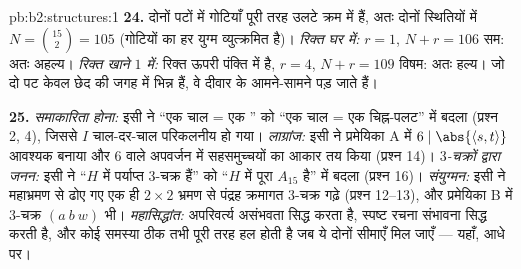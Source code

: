 \begin{solution}{pb:b2:structures:1}
\textbf{24.} दोनों पटों में गोटियाँ पूरी तरह उलटे क्रम में हैं, अतः
दोनों स्थितियों में $N = \binom{15}{2} = 105$ (गोटियों का हर युग्म व्युत्क्रमित है)।
\emph{रिक्त घर में:} $r = 1$, $N + r = 106$ सम: अतः अहल्य। \emph{रिक्त खाने $1$
में:} रिक्त ऊपरी पंक्ति में है, $r = 4$, $N + r = 109$ विषम: अतः हल्य। जो दो पट
केवल छेद की जगह में भिन्न हैं, वे दीवार के आमने-सामने पड़ जाते हैं।

\textbf{25.} \emph{समाकारिता होना:} इसी ने ``एक चाल = एक '' को
``एक चाल = एक चिह्न-पलट'' में बदला (प्रश्न 2, 4), जिससे $I$ चाल-दर-चाल
परिकलनीय हो गया। \emph{लाग्रांज:} इसी ने प्रमेयिका A में $6 \mid \abs{\langle s, t\rangle}$ आवश्यक
बनाया और  $6$ वाले अपवर्जन में सहसमुच्चयों का आकार तय किया (प्रश्न
14)। \emph{$3$-चक्रों द्वारा जनन:} इसी ने ``$H$ में पर्याप्त $3$-चक्र
हैं'' को ``$H$ में पूरा $A_{15}$ है'' में बदला (प्रश्न 16)। \emph{संयुग्मन:}
इसी ने महाभ्रमण से ढोए गए एक ही $2 \times 2$ भ्रमण से पंद्रह क्रमागत $3$-चक्र
गढ़े (प्रश्न 12--13), और प्रमेयिका B में $3$-चक्र $(a\ b\ w)$ भी।
\emph{महासिद्धांत:} अपरिवर्त्य असंभवता सिद्ध करता है, स्पष्ट रचना
संभावना सिद्ध करती है, और कोई समस्या ठीक तभी पूरी तरह हल होती है जब ये
दोनों सीमाएँ मिल जाएँ --- यहाँ, आधे पर।
\end{solution}
